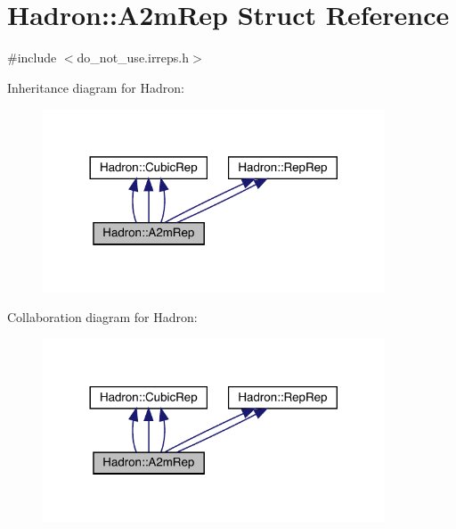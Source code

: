 \hypertarget{structHadron_1_1A2mRep}{}\section{Hadron\+:\+:A2m\+Rep Struct Reference}
\label{structHadron_1_1A2mRep}


{\ttfamily \#include $<$do\+\_\+not\+\_\+use.\+irreps.\+h$>$}



Inheritance diagram for Hadron\+:
\nopagebreak
\begin{figure}[H]
\begin{center}
\leavevmode
\includegraphics[width=288pt]{de/d42/structHadron_1_1A2mRep__inherit__graph}
\end{center}
\end{figure}


Collaboration diagram for Hadron\+:
\nopagebreak
\begin{figure}[H]
\begin{center}
\leavevmode
\includegraphics[width=288pt]{de/d8b/structHadron_1_1A2mRep__coll__graph}
\end{center}
\end{figure}

